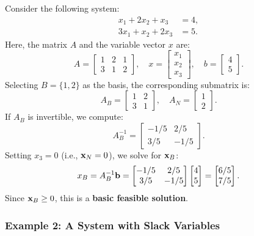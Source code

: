 Consider the following system:
\[
\begin{aligned}
    x_1 + 2x_2 + x_3 &= 4, \\
    3x_1 + x_2 + 2x_3 &= 5.
\end{aligned}
\]
Here, the matrix \( A \) and the variable vector \( x \) are:
\[
A =
\begin{bmatrix}
    1 & 2 & 1 \\
    3 & 1 & 2
\end{bmatrix}, \quad
x =
\begin{bmatrix}
    x_1 \\ x_2 \\ x_3
\end{bmatrix}, \quad
b =
\begin{bmatrix}
    4 \\ 5
\end{bmatrix}.
\]
Selecting \(B= \{1, 2\} \) as the basis, the corresponding submatrix is:
\[
A_B =
\begin{bmatrix}
    1 & 2 \\
    3 & 1
\end{bmatrix}, \quad A_N =
\begin{bmatrix}
    1 \\
    2
\end{bmatrix}.
\]
If \( A_B \) is invertible, we compute:
\[
A_B^{-1} =
\begin{bmatrix}
    -1/5 & 2/5 \\
    3/5 & -1/5
\end{bmatrix}.
\]
Setting \( x_3 = 0 \) (i.e., \( \mathbf{x}_N = 0 \)), we solve for \( \mathbf{x}_B \):
\[
x_B = A_B^{-1}\mathbf{b}=
\begin{bmatrix}
    -1/5 & 2/5 \\
    3/5 & -1/5
\end{bmatrix}
\begin{bmatrix}
    4 \\ 5
\end{bmatrix}
=
\begin{bmatrix}
    6/5 \\
    7/5
\end{bmatrix}.
\]
Since \( \mathbf{x}_B \geq 0 \), this is a \textbf{basic feasible solution}.

\subsubsection*{Example 2: A System with Slack Variables}

